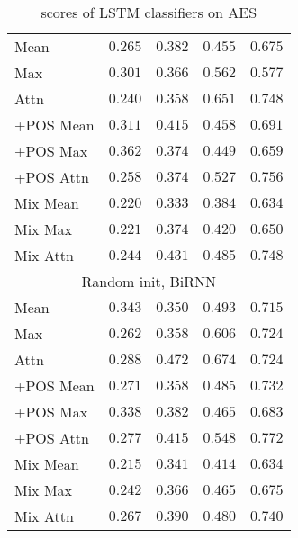 \begin{table}
\begin{tabular}{lrrrr}
    Mean & $0.265$ & $0.382$ & $0.455$ & $0.675$ \\
    Max & $0.301$ & $0.366$ & $0.562$ & $0.577$ \\
    Attn & $0.240$ & $0.358$ & $0.651$ & $0.748$ \\
    +POS Mean & $0.311$ & $0.415$ & $0.458$ & $0.691$ \\
    +POS Max & $\mathbf{0.362}$ & $0.374$ & $0.449$ & $0.659$ \\
    +POS Attn & $0.258$ & $0.374$ & $0.527$ & $0.756$ \\
    Mix Mean & $0.220$ & $0.333$ & $0.384$ & $0.634$ \\
    Mix Max & $0.221$ & $0.374$ & $0.420$ & $0.650$ \\
    Mix Attn & $0.244$ & $0.431$ & $0.485$ & $0.748$ \\
    \midrule \multicolumn{5}{c}{Random init, BiRNN} \\ \midrule
    Mean & $0.343$ & $0.350$ & $0.493$ & $0.715$ \\
    Max & $0.262$ & $0.358$ & $0.606$ & $0.724$ \\
    Attn & $0.288$ & $\mathbf{0.472}$ & $\mathbf{0.674}$ & $0.724$ \\
    +POS Mean & $0.271$ & $0.358$ & $0.485$ & $0.732$ \\
    +POS Max & $0.338$ & $0.382$ & $0.465$ & $0.683$ \\
    +POS Attn & $0.277$ & $0.415$ & $0.548$ & $\mathbf{0.772}$ \\
    Mix Mean & $0.215$ & $0.341$ & $0.414$ & $0.634$ \\
    Mix Max & $0.242$ & $0.366$ & $0.465$ & $0.675$ \\
    Mix Attn & $0.267$ & $0.390$ & $0.480$ & $0.740$ \\
    \bottomrule
  \end{tabular}
  \caption{\FI scores of LSTM classifiers on AES}
  \label{tab:lstm-results}
\end{table}

